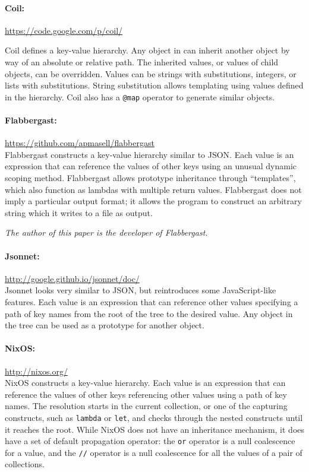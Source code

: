\documentclass[letterpaper,twocolumn,10pt]{article}
\begin{document}
\paragraph{Coil:} \url{https://code.google.com/p/coil/}

\noindent Coil defines a key-value hierarchy. Any object in can inherit another object by way of an absolute or relative path. The inherited values, or values of child objects, can be overridden. Values can be strings with substitutions, integers, or lists with substitutions. String substitution allows templating using values defined in the hierarchy. Coil also has a \texttt{@map} operator to generate similar objects.

\paragraph{Flabbergast:} \url{https://github.com/apmasell/flabbergast} \\

\noindent Flabbergast constructs a key-value hierarchy similar to JSON. Each value is an expression that can reference the values of other keys using an unusual dynamic scoping method. Flabbergast allows prototype inheritance through ``templates'', which also function as lambdas with multiple return values. Flabbergast does not imply a particular output format; it allows the program to construct an arbitrary string which it writes to a file as output.

\noindent\emph{The author of this paper is the developer of Flabbergast.}

\paragraph{Jsonnet:} \url{http://google.github.io/jsonnet/doc/} \\

\noindent Jsonnet looks very similar to JSON, but reintroduces some JavaScript-like features. Each value is an expression that can reference other values specifying a path of key names from the root of the tree to the desired value. Any object in the tree can be used as a prototype for another object.

\paragraph{NixOS:} \url{http://nixos.org/} \\

\noindent NixOS constructs a key-value hierarchy. Each value is an expression that can reference the values of other keys referencing other values using a path of key names. The resolution starts in the current collection, or one of the capturing constructs, such as \texttt{lambda} or \texttt{let}, and checks through the nested constructs until it reaches the root. While NixOS does not have an inheritance mechanism, it does have a set of default propagation operator: the \texttt{or} operator is a null coalescence for a value, and the \texttt{//} operator is a null coalescence for all the values of a pair of collections.
\end{document}
